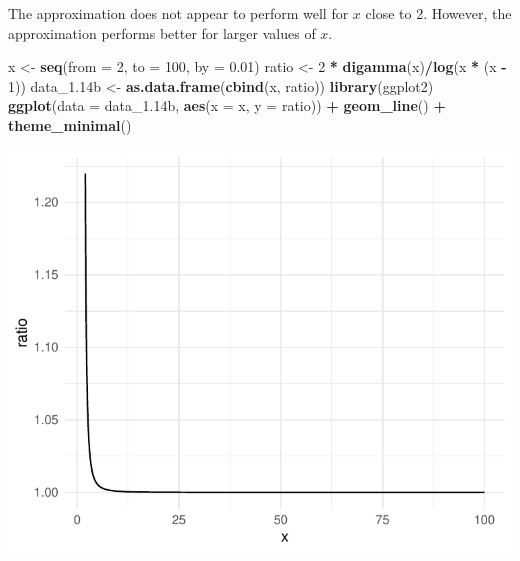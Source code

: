 \documentclass[12pt,]{article}
\newenvironment{Shaded}{\begin{snugshade}}{\end{snugshade}}
\newcommand{\DataTypeTok}[1]{\textcolor[rgb]{0.13,0.29,0.53}{#1}}
\newcommand{\DecValTok}[1]{\textcolor[rgb]{0.00,0.00,0.81}{#1}}
\newcommand{\FloatTok}[1]{\textcolor[rgb]{0.00,0.00,0.81}{#1}}
\newcommand{\KeywordTok}[1]{\textcolor[rgb]{0.13,0.29,0.53}{\textbf{#1}}}
\newcommand{\NormalTok}[1]{#1}
\newcommand{\OperatorTok}[1]{\textcolor[rgb]{0.81,0.36,0.00}{\textbf{#1}}}
\newcommand{\StringTok}[1]{\textcolor[rgb]{0.31,0.60,0.02}{#1}}
\begin{document}
The approximation does not appear to perform well for \(x\) close to 2.
However, the approximation performs better for larger values of \(x\).

\begin{Shaded}
\begin{Highlighting}[]
\NormalTok{x <-}\StringTok{ }\KeywordTok{seq}\NormalTok{(}\DataTypeTok{from =} \DecValTok{2}\NormalTok{, }\DataTypeTok{to =} \DecValTok{100}\NormalTok{, }\DataTypeTok{by =} \FloatTok{0.01}\NormalTok{)}
\NormalTok{ratio <-}\StringTok{ }\DecValTok{2} \OperatorTok{*}\StringTok{ }\KeywordTok{digamma}\NormalTok{(x)}\OperatorTok{/}\KeywordTok{log}\NormalTok{(x }\OperatorTok{*}\StringTok{ }\NormalTok{(x }\OperatorTok{-}\StringTok{ }\DecValTok{1}\NormalTok{))}
\NormalTok{data_}\FloatTok{1.14}\NormalTok{b <-}\StringTok{ }\KeywordTok{as.data.frame}\NormalTok{(}\KeywordTok{cbind}\NormalTok{(x, ratio))}
\KeywordTok{library}\NormalTok{(ggplot2)}
\KeywordTok{ggplot}\NormalTok{(}\DataTypeTok{data =}\NormalTok{ data_}\FloatTok{1.14}\NormalTok{b, }\KeywordTok{aes}\NormalTok{(}\DataTypeTok{x =}\NormalTok{ x, }\DataTypeTok{y =}\NormalTok{ ratio)) }\OperatorTok{+}\StringTok{ }
\StringTok{    }\KeywordTok{geom_line}\NormalTok{() }\OperatorTok{+}\StringTok{ }\KeywordTok{theme_minimal}\NormalTok{()}
\end{Highlighting}
\end{Shaded}

\begin{center}\includegraphics{Homework1_files/figure-latex/exe_1.14b-1} \end{center}
\end{document}
